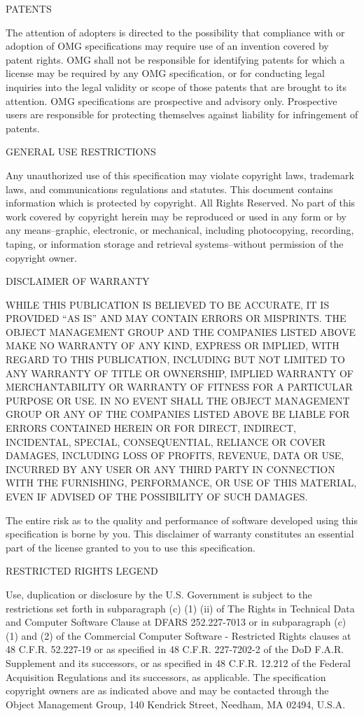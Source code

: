 \documentclass[10pt,fleqn,final]{scrreprt}
\newcommand{\OMGparagraph}[1]{
\vspace{3pt}
{\centerline {#1}}
\vspace{3pt}
}
\begin{document}
\OMGparagraph{PATENTS}
The attention of adopters is directed to the possibility that compliance with or adoption of OMG specifications may require use of an invention covered by patent rights. OMG shall not be responsible for identifying patents for which a
 license may be required by any OMG specification, or for conducting legal inquiries into the legal validity or scope of those patents that are brought to its attention. OMG specifications are prospective and advisory only.
  Prospective users are responsible for protecting themselves against liability for infringement of patents.

\OMGparagraph{GENERAL USE RESTRICTIONS}
Any unauthorized use of this specification may violate copyright laws, trademark laws, and communications regulations and statutes. This document contains information which is protected by copyright. All Rights Reserved. No
part of this work covered by copyright herein may be reproduced or used in any form or by any means--graphic, electronic, or mechanical, including
 photocopying, recording, taping, or information storage and retrieval systems--without permission of the copyright owner.




\OMGparagraph{DISCLAIMER OF WARRANTY}
WHILE THIS PUBLICATION IS BELIEVED TO BE ACCURATE, IT IS PROVIDED ``AS IS'' AND MAY CONTAIN ERRORS OR MISPRINTS. THE OBJECT MANAGEMENT GROUP AND THE COMPANIES LISTED ABOVE MAKE NO WARRANTY OF ANY KIND, EXPRESS OR IMPLIED, WITH REGARD TO THIS PUBLICATION, INCLUDING BUT NOT LIMITED TO ANY WARRANTY OF TITLE OR OWNERSHIP, IMPLIED WARRANTY OF MERCHANTABILITY OR WARRANTY OF FITNESS FOR A PARTICULAR PURPOSE OR USE. 
IN NO EVENT SHALL THE OBJECT MANAGEMENT GROUP OR ANY OF THE COMPANIES LISTED ABOVE BE LIABLE FOR ERRORS CONTAINED HEREIN OR FOR DIRECT, INDIRECT, INCIDENTAL, SPECIAL, CONSEQUENTIAL, RELI\-ANCE OR COVER DAMAGES, INCLUDING LOSS
 OF PROFITS, REVENUE, DATA OR USE, INCURRED BY ANY USER OR ANY THIRD PARTY IN CONNECTION WITH THE FURNISHING, PERFORMANCE, OR USE OF THIS MATERIAL, EVEN IF ADVISED OF THE POSSIBILITY OF SUCH DAMAGES. 

The entire risk as to the quality and performance of software developed using this specification is borne by you. This disclaimer of warranty constitutes an
 essential part of the license granted to you to use this specification.

\OMGparagraph{RESTRICTED RIGHTS LEGEND}
Use, duplication or disclosure by the U.S. Government  is subject to the restrictions set forth in subparagraph (c) (1) (ii) of The Rights in Technical Data and Computer Software Clause at DFARS 252.227-7013 or in subparagraph
 (c)(1) and (2) of the Commercial Computer Software - Restricted Rights clauses at 48 C.F.R. 52.227-19 or as specified in 48 C.F.R. 227-7202-2 of the DoD F.A.R. Supplement and its successors, or as specified in 48 C.F.R. 12.212 of
  the Federal Acquisition Regulations and its successors, as applicable. The specification copyright owners are as indicated above and may be contacted through the Object Management Group, 140 Kendrick Street, Needham, MA 02494, U.S.A.
\end{document}
